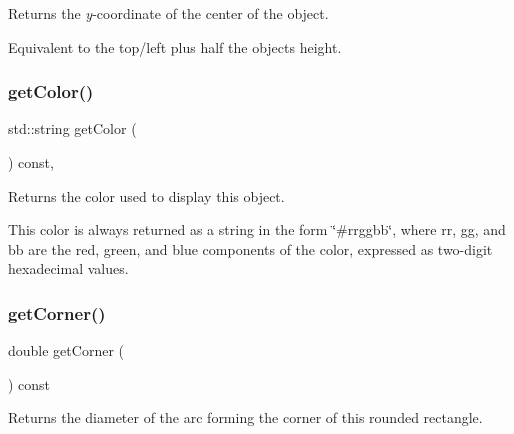 Returns the {\itshape y}-\/coordinate of the center of the object. 

Equivalent to the top/left plus half the object\textquotesingle{}s height. \mbox{\label{classsgl_1_1GObject_aa061dfa488c31e18549d64363c1d0e34}} 
\subsubsection{\texorpdfstring{get\+Color()}{getColor()}}
{\footnotesize\ttfamily std\+::string get\+Color (\begin{DoxyParamCaption}{ }\end{DoxyParamCaption}) const\hspace{0.3cm}{\ttfamily [virtual]}, {\ttfamily [inherited]}}



Returns the color used to display this object. 

This color is always returned as a string in the form {\ttfamily \char`\"{}\#rrggbb\char`\"{}}, where {\ttfamily rr}, {\ttfamily gg}, and {\ttfamily bb} are the red, green, and blue components of the color, expressed as two-\/digit hexadecimal values. \mbox{\label{classsgl_1_1GRoundRect_ad29f4fe71bbd3f4302d25adbee70ba2b}} 
\subsubsection{\texorpdfstring{get\+Corner()}{getCorner()}}
{\footnotesize\ttfamily double get\+Corner (\begin{DoxyParamCaption}{ }\end{DoxyParamCaption}) const\hspace{0.3cm}{\ttfamily [virtual]}}



Returns the diameter of the arc forming the corner of this rounded rectangle. 

\mbox{\label{classsgl_1_1GObject_a76f6964a11fde7c78e9751be184e1a3c}} 
